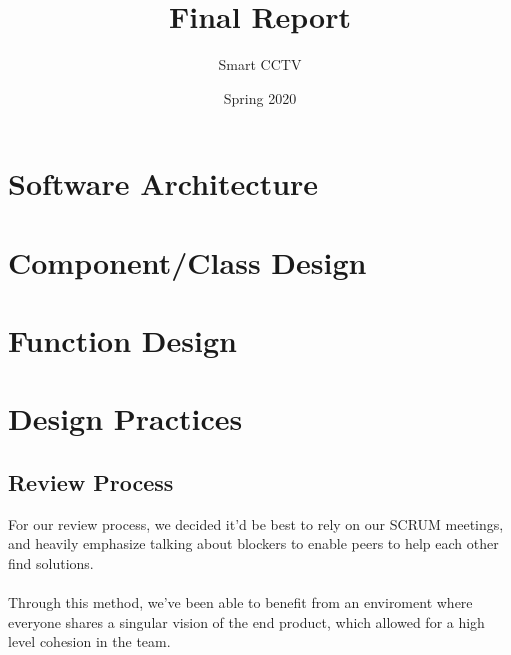 \documentclass[12pt]{article}
\title{Final Report}
\author{Smart CCTV}
\date{Spring 2020}
\begin{document}
\maketitle
\pagebreak

\section*{Software Architecture}
\pagebreak

\section*{Component/Class Design}

\pagebreak

\section*{Function Design}
\pagebreak

\section*{Design Practices}
\subsection*{Review Process}
For our review process, we decided it'd be best to rely on our SCRUM meetings, and heavily emphasize talking about blockers to enable peers to help each other find solutions.
\\
\\Through this method, we've been able to benefit from an enviroment where everyone shares a singular vision of the end product, which allowed for a high level cohesion in the team.
\end{document}
